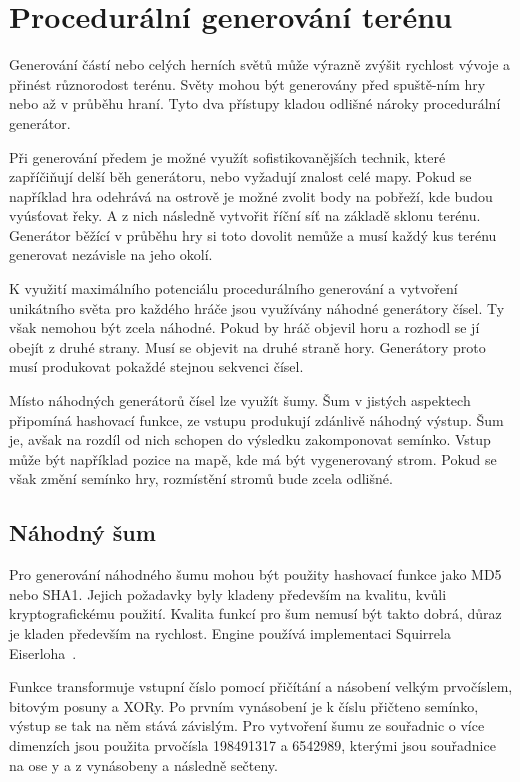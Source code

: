 \documentclass[thesis=M,czech]{FITthesis}[2019/12/23]
\begin{document}

\chapter{Procedurální generování terénu}

Generování částí nebo celých herních světů může výrazně zvýšit rychlost vývoje a přinést různorodost terénu. Světy mohou být generovány před spuště-ním hry nebo až v průběhu hraní. Tyto dva přístupy kladou odlišné nároky procedurální generátor.

Při generování předem je možné využít sofistikovanějších technik, které zapříčiňují delší běh generátoru, nebo vyžadují znalost celé mapy. Pokud se například hra odehrává na ostrově je možné zvolit body na pobřeží, kde budou vyúsťovat řeky. A z nich následně vytvořit říční síť na základě sklonu terénu. Generátor běžící v průběhu hry si toto dovolit nemůže a musí každý kus terénu generovat nezávisle na jeho okolí.

K využití maximálního potenciálu procedurálního generování a vytvoření unikátního světa pro každého hráče jsou využívány náhodné generátory čísel. Ty však nemohou být zcela náhodné. Pokud by hráč objevil horu a rozhodl se jí obejít z druhé strany. Musí se objevit na druhé straně hory. Generátory proto musí produkovat pokaždé stejnou sekvenci čísel.

Místo náhodných generátorů čísel lze využít šumy. Šum v jistých aspektech připomíná hashovací funkce, ze vstupu produkují zdánlivě náhodný výstup. Šum je, avšak na rozdíl od nich schopen do výsledku zakomponovat semínko. Vstup může být například pozice na mapě, kde má být vygenerovaný strom. Pokud se však změní semínko hry, rozmístění stromů bude zcela odlišné.

\section{Náhodný šum}

Pro generování náhodného šumu mohou být použity hashovací funkce jako MD5 nebo SHA1. Jejich požadavky byly kladeny především na kvalitu, kvůli kryptografickému použití. Kvalita funkcí pro šum nemusí být takto dobrá, důraz je kladen především na rychlost. Engine používá implementaci Squirrela Eiserloha~\cite{sqr_noise}.

Funkce transformuje vstupní číslo pomocí přičítání a násobení velkým prvočíslem, bitovým posuny a XORy. Po prvním vynásobení je k číslu přičteno semínko, výstup se tak na něm stává závislým. Pro vytvoření šumu ze souřadnic o více dimenzích jsou použita prvočísla 198491317 a 6542989, kterými jsou souřadnice na ose y a z vynásobeny a následně sečteny.
\end{document}
